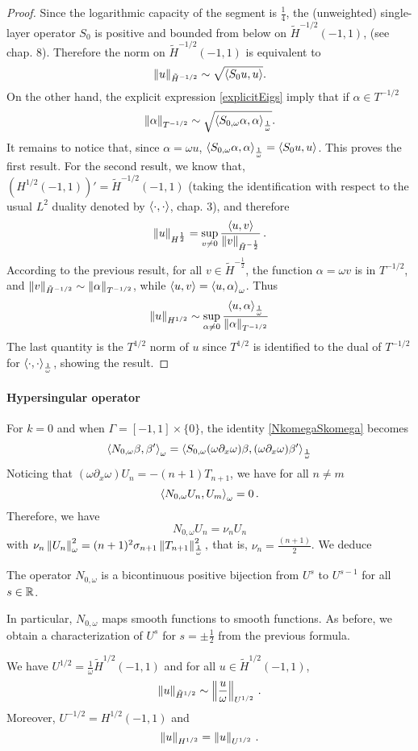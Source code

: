 \documentclass[a4paper]{article}
\begin{document}
\begin{proof}
	Since the logarithmic capacity of the segment is $\frac{1}{4}$, the (unweighted) single-layer operator $S_0$ is positive and bounded from below on $\tilde{H}^{-1/2}(-1,1)$, (see \cite{mclean2000strongly} chap. 8). Therefore the norm on $\tilde{H}^{-1/2}(-1,1)$ is equivalent to 
	\[\left\|u\right\|_{\tilde{H}^{-1/2}} \sim \sqrt{\left\langle S_0u,u\right\rangle}.\]
	On the other hand, the explicit expression \eqref{explicitEigs} imply that if $\alpha\in T^{-1/2}$
	\[ \left\|\alpha\right\|_{T^{-1/2}} \sim \sqrt{\left\langle S_{0,\omega} \alpha,\alpha\right\rangle_\frac{1}{\omega}}.\]
	It remains to notice that, since $\alpha=\omega u$, $\left\langle S_{0,\omega} \alpha,\alpha\right\rangle_\frac{1}{\omega} = \left\langle S_0u,u\right\rangle$. This proves the first result. For the second result, we know that, $(H^{1/2}(-1,1))' =  \tilde{H}^{-1/2}(-1,1)$ (taking the identification with respect to the usual $L^2$ duality denoted by $\left\langle \cdot,\cdot\right\rangle$, \cite{mclean1986spectral} chap. 3), and therefore
	\[\left\|u\right\|_{H^{\frac{1}{2}}} = \sup_{ v\neq 0} \dfrac{\left\langle u,v\right\rangle}{\left\|v\right\|_{\tilde{H}^{-\frac{1}{2}}}}\,.\]
	According to the previous result, for all $v\in \tilde{H}^{-\frac{1}{2}}$, the function $\alpha = \omega v$ is in $T^{-1/2}$, and $\left\| v\right\|_{\tilde{H}^{-1/2}} \sim \left\|\alpha\right\|_{T^{-1/2}}$, while $\left\langle u,v\right\rangle = \left\langle u,\alpha\right\rangle_\omega$. Thus 
	\[\left\|u\right\|_{H^{1/2}} \sim \sup_{\alpha \neq 0} \dfrac{\left\langle u,\alpha\right\rangle_\frac{1}{\omega}}{\left\|\alpha\right\|_{T^{-1/2}}}\]
	The last quantity is the $T^{1/2}$ norm of $u$ since $T^{1/2}$ is identified to the dual of $T^{-1/2}$ for $\left\langle \cdot,\cdot\right\rangle_\frac{1}{\omega}$, showing the result. 
\end{proof}


\paragraph{Hypersingular operator}For $k = 0$ and when $\Gamma = [-1,1]\times \{0\}$, the identity \eqref{NkomegaSkomega} becomes
\[\left\langle N_{0,\omega} \beta,\beta'\right\rangle_\omega = \left\langle S_{0,\omega}  (\omega \partial_x \omega) \beta, (\omega \partial_x \omega) \beta'\right\rangle_\frac{1}{\omega}\] 
Noticing that $(\omega \partial_x \omega) U_n = -(n+1) T_{n+1}$, we have for all $n \neq m$ 
\[\left\langle N_{0,\omega }U_n,U_m\right\rangle_\omega = 0 \,.\]
Therefore, we have 
\[N_{0,\omega} U_n = \nu_n U_n\] 
with 
$\nu_n\left\|U_n\right\|_{\omega}^2 = (n+1)^2 \sigma_{n+1} \left\|T_{n+1}\right\|_\frac{1}{\omega}^2,$
that is, $\nu_n = \frac{(n+1)}{2}$.
We deduce 
\begin{Lem}
	The operator $N_{0,\omega}$ is a bicontinuous positive bijection from $U^s$ to $U^{s-1}$ for all $s \in \mathbb{R}$.
	\label{NomegaMapProp}
\end{Lem} 
\noindent In particular, $N_{0,\omega}$ maps smooth functions to smooth functions. 
As before, we obtain a characterization of $U^{s}$ for $s = \pm \frac{1}{2}$ from the previous formula.
\begin{Lem} 
	\label{LemU12}	
	We have $U^{1/2} =  \frac{1}{\omega} \tilde{H}^{1/2}(-1,1)$ and for all $u\in \tilde{H}^{1/2}(-1,1)$,
	\[\left\|u\right\|_{\tilde{H}^{1/2}} \sim \left\|\frac{u}{\omega}\right\|_{U^{1/2}}\,.\]
	Moreover, $U^{-1/2} = H^{1/2}(-1,1)$ and 
	\[\left\|u\right\|_{H^{1/2}} = \left\|u\right\|_{U^{1/2}}\,.\]
\end{Lem}
\end{document}
